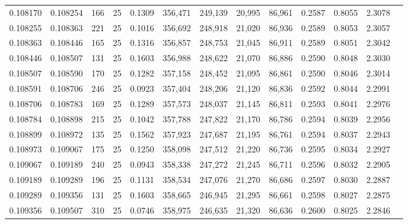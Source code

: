 \begin{tabular}{rrrrrrrrrrrrr}
0.108170 & 0.108254 &   166 &  25 &                                     0.1309 & 356,471 & 249,139 &  20,995 &  86,961 & 0.2587 & 0.8055 & 2.3078 \\
0.108255 & 0.108363 &   221 &  25 &                                     0.1016 & 356,692 & 248,918 &  21,020 &  86,936 & 0.2589 & 0.8053 & 2.3057 \\
0.108363 & 0.108446 &   165 &  25 &                                     0.1316 & 356,857 & 248,753 &  21,045 &  86,911 & 0.2589 & 0.8051 & 2.3042 \\
0.108446 & 0.108507 &   131 &  25 &                                     0.1603 & 356,988 & 248,622 &  21,070 &  86,886 & 0.2590 & 0.8048 & 2.3030 \\
0.108507 & 0.108590 &   170 &  25 &                                     0.1282 & 357,158 & 248,452 &  21,095 &  86,861 & 0.2590 & 0.8046 & 2.3014 \\
0.108591 & 0.108706 &   246 &  25 &                                     0.0923 & 357,404 & 248,206 &  21,120 &  86,836 & 0.2592 & 0.8044 & 2.2991 \\
0.108706 & 0.108783 &   169 &  25 &                                     0.1289 & 357,573 & 248,037 &  21,145 &  86,811 & 0.2593 & 0.8041 & 2.2976 \\
0.108784 & 0.108898 &   215 &  25 &                                     0.1042 & 357,788 & 247,822 &  21,170 &  86,786 & 0.2594 & 0.8039 & 2.2956 \\
0.108899 & 0.108972 &   135 &  25 &                                     0.1562 & 357,923 & 247,687 &  21,195 &  86,761 & 0.2594 & 0.8037 & 2.2943 \\
0.108973 & 0.109067 &   175 &  25 &                                     0.1250 & 358,098 & 247,512 &  21,220 &  86,736 & 0.2595 & 0.8034 & 2.2927 \\
0.109067 & 0.109189 &   240 &  25 &                                     0.0943 & 358,338 & 247,272 &  21,245 &  86,711 & 0.2596 & 0.8032 & 2.2905 \\
0.109189 & 0.109289 &   196 &  25 &                                     0.1131 & 358,534 & 247,076 &  21,270 &  86,686 & 0.2597 & 0.8030 & 2.2887 \\
0.109289 & 0.109356 &   131 &  25 &                                     0.1603 & 358,665 & 246,945 &  21,295 &  86,661 & 0.2598 & 0.8027 & 2.2875 \\
0.109356 & 0.109507 &   310 &  25 &                                     0.0746 & 358,975 & 246,635 &  21,320 &  86,636 & 0.2600 & 0.8025 & 2.2846 \\

\end{tabular}

